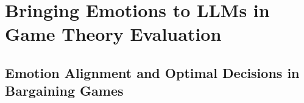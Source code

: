 \documentclass{article}
\begin{document}

\section{Bringing Emotions to LLMs in Game Theory Evaluation}

\subsection{Emotion Alignment and Optimal Decisions %
in Bargaining Games}

\end{document}
